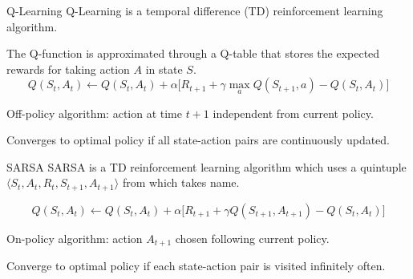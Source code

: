 \begin{frame}{Q-Learning}
    Q-Learning is a temporal difference (TD) reinforcement learning algorithm.
    
    The Q-function is approximated through a Q-table that stores the expected rewards for taking action $A$ in state $S$.
    \begin{equation*}
    Q(S_t, A_t) \leftarrow Q(S_t, A_t) + \alpha \Big[ R_{t+1} +
    \gamma \max_{a} Q(S_{t+1}, a) - Q(S_t, A_t) \Big]
    \end{equation*}
    
    Off-policy algorithm: action at time $t+1$ independent from current policy.
    
    Converges to optimal policy if all state-action pairs are continuously updated.
\end{frame}

\begin{frame}{SARSA}
    SARSA is a TD reinforcement learning algorithm which uses a quintuple $\langle S_t, A_t, R_t, S_{t+1}, A_{t+1}\rangle$ from which takes name.
    
    \begin{equation*}
        Q(S_t, A_t) \leftarrow Q(S_t, A_t) + \alpha \Big[ R_{t+1} +
            \gamma Q(S_{t+1}, A_{t+1}) - Q(S_t, A_t) \Big]
    \end{equation*}
    
    On-policy algorithm: action $A_{t+1}$ chosen following current policy.
    
    Converge to optimal policy if each state-action pair is visited infinitely often.
\end{frame}
